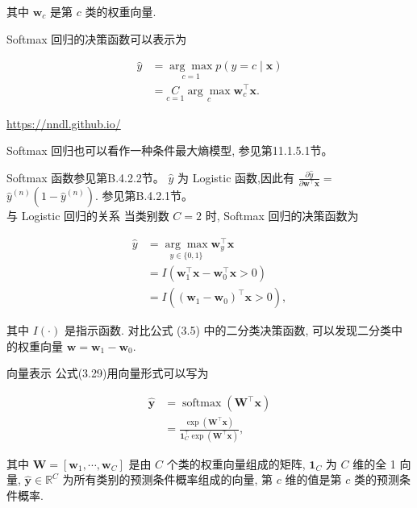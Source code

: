 \documentclass[10pt]{article}
\begin{document}
其中 $\boldsymbol{w}_{c}$ 是第 $c$ 类的权重向量.

Softmax 回归的决策函数可以表示为


\begin{align*}
\hat{y} & =\underset{c=1}{\arg \max } p(y=c \mid \boldsymbol{x})  \tag{3.30}\\
& =\underset{c=1}{C} \underset{c}{\arg \max } \boldsymbol{w}_{c}^{\top} \boldsymbol{x} . \tag{3.31}
\end{align*}


\href{https://nndl.github.io/}{https://nndl.github.io/}

Softmax 回归也可以看作一种条件最大熵模型, 参见第11.1.5.1节。

Softmax 函数参见第B.4.2.2节。 $\hat{y}$ 为 Logistic 函数,因此有 $\frac{\partial \hat{y}}{\partial \boldsymbol{w}^{\top} \boldsymbol{x}}=$ $\hat{y}^{(n)}\left(1-\hat{y}^{(n)}\right)$. 参见第B.4.2.1节。\\
与 Logistic 回归的关系 当类别数 $C=2$ 时, Softmax 回归的决策函数为


\begin{align*}
\hat{y} & =\underset{y \in\{0,1\}}{\arg \max } \boldsymbol{w}_{y}^{\top} \boldsymbol{x}  \tag{3.32}\\
& =I\left(\boldsymbol{w}_{1}^{\top} \boldsymbol{x}-\boldsymbol{w}_{0}^{\top} \boldsymbol{x}>0\right)  \tag{3.33}\\
& =I\left(\left(\boldsymbol{w}_{1}-\boldsymbol{w}_{0}\right)^{\top} \boldsymbol{x}>0\right), \tag{3.34}
\end{align*}


其中 $I(\cdot)$ 是指示函数. 对比公式 (3.5) 中的二分类决策函数, 可以发现二分类中的权重向量 $\boldsymbol{w}=\boldsymbol{w}_{1}-\boldsymbol{w}_{0}$.

向量表示 公式(3.29)用向量形式可以写为


\begin{align*}
\hat{\boldsymbol{y}} & =\operatorname{softmax}\left(\boldsymbol{W}^{\top} \boldsymbol{x}\right)  \tag{3.35}\\
& =\frac{\exp \left(\boldsymbol{W}^{\top} \boldsymbol{x}\right)}{\mathbf{1}_{C}^{\top} \exp \left(\boldsymbol{W}^{\top} \boldsymbol{x}\right)}, \tag{3.36}
\end{align*}


其中 $\boldsymbol{W}=\left[\boldsymbol{w}_{1}, \cdots, \boldsymbol{w}_{C}\right]$ 是由 $C$ 个类的权重向量组成的矩阵, $\boldsymbol{1}_{C}$ 为 $C$ 维的全 1 向量, $\hat{\boldsymbol{y}} \in \mathbb{R}^{C}$ 为所有类别的预测条件概率组成的向量, 第 $c$ 维的值是第 $c$ 类的预测条件概率.
\end{document}
